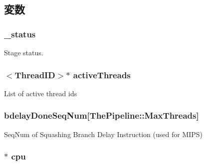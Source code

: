 \subsection{変数}
\hypertarget{classPipelineStage_a4530a0391410036c939865008a53f356}{
\subsubsection[{\_\-status}]{ {\bf \_\-status}}}
\label{classPipelineStage_a4530a0391410036c939865008a53f356}
Stage status. \hypertarget{classPipelineStage_af6eaea53db532812052f71bf0380dab5}{
\subsubsection[{activeThreads}]{$<${\bf ThreadID}$>$$\ast$ {\bf activeThreads}}}
\label{classPipelineStage_af6eaea53db532812052f71bf0380dab5}
List of active thread ids \hypertarget{classPipelineStage_ab949b1ea7ed96a92d473eeaa17348bed}{
\subsubsection[{bdelayDoneSeqNum}]{ {\bf bdelayDoneSeqNum}\mbox{[}{\bf ThePipeline::MaxThreads}\mbox{]}}}
\label{classPipelineStage_ab949b1ea7ed96a92d473eeaa17348bed}
SeqNum of Squashing Branch Delay Instruction (used for MIPS) \hypertarget{classPipelineStage_a41d682c28d0f49e04393c52815808782}{
\subsubsection[{cpu}]{$\ast$ {\bf cpu}}}
